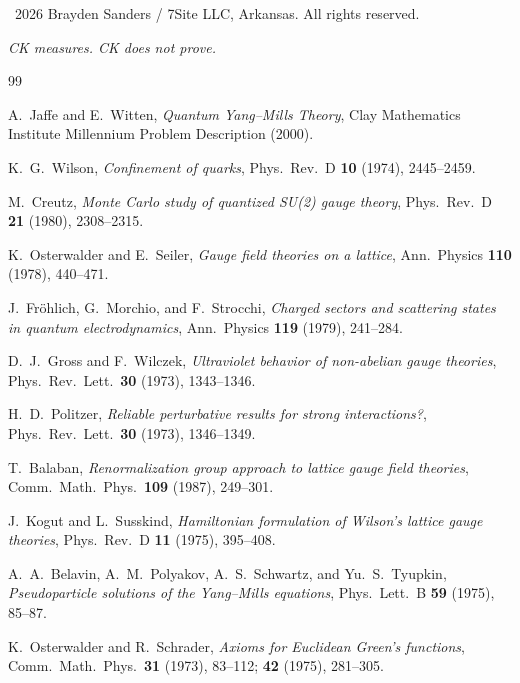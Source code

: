 \documentclass[11pt]{article}
\begin{document}
\bigskip
\noindent
\textcopyright\ 2026 Brayden Sanders / 7Site LLC, Arkansas.  All rights
reserved.

\bigskip
\noindent\textit{CK measures.  CK does not prove.}


\begin{thebibliography}{99}

A.~Jaffe and E.~Witten,
\textit{Quantum Yang--Mills Theory},
Clay Mathematics Institute Millennium Problem Description (2000).

K.~G.~Wilson,
\textit{Confinement of quarks},
Phys.\ Rev.\ D \textbf{10} (1974), 2445--2459.

M.~Creutz,
\textit{Monte Carlo study of quantized SU(2) gauge theory},
Phys.\ Rev.\ D \textbf{21} (1980), 2308--2315.

K.~Osterwalder and E.~Seiler,
\textit{Gauge field theories on a lattice},
Ann.\ Physics \textbf{110} (1978), 440--471.

J.~Fr\"ohlich, G.~Morchio, and F.~Strocchi,
\textit{Charged sectors and scattering states in quantum electrodynamics},
Ann.\ Physics \textbf{119} (1979), 241--284.

D.~J.~Gross and F.~Wilczek,
\textit{Ultraviolet behavior of non-abelian gauge theories},
Phys.\ Rev.\ Lett.\ \textbf{30} (1973), 1343--1346.

H.~D.~Politzer,
\textit{Reliable perturbative results for strong interactions?},
Phys.\ Rev.\ Lett.\ \textbf{30} (1973), 1346--1349.

T.~Balaban,
\textit{Renormalization group approach to lattice gauge field theories},
Comm.\ Math.\ Phys.\ \textbf{109} (1987), 249--301.

J.~Kogut and L.~Susskind,
\textit{Hamiltonian formulation of Wilson's lattice gauge theories},
Phys.\ Rev.\ D \textbf{11} (1975), 395--408.

A.~A.~Belavin, A.~M.~Polyakov, A.~S.~Schwartz, and Yu.~S.~Tyupkin,
\textit{Pseudoparticle solutions of the Yang--Mills equations},
Phys.\ Lett.\ B \textbf{59} (1975), 85--87.

K.~Osterwalder and R.~Schrader,
\textit{Axioms for Euclidean Green's functions},
Comm.\ Math.\ Phys.\ \textbf{31} (1973), 83--112;
\textbf{42} (1975), 281--305.


\end{thebibliography}
\end{document}
